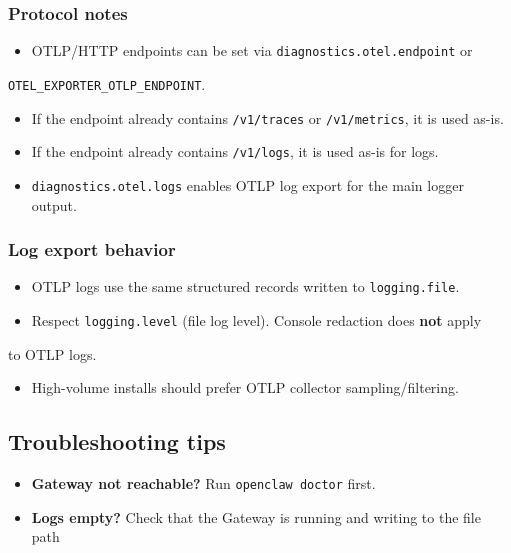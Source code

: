 \subsubsection{Protocol notes}


\begin{itemize}
  \item OTLP/HTTP endpoints can be set via \texttt{diagnostics.otel.endpoint} or
\end{itemize}

\texttt{OTEL\_EXPORTER\_OTLP\_ENDPOINT}.
\begin{itemize}
  \item If the endpoint already contains \texttt{/v1/traces} or \texttt{/v1/metrics}, it is used as-is.
  \item If the endpoint already contains \texttt{/v1/logs}, it is used as-is for logs.
  \item \texttt{diagnostics.otel.logs} enables OTLP log export for the main logger output.
\end{itemize}


\subsubsection{Log export behavior}


\begin{itemize}
  \item OTLP logs use the same structured records written to \texttt{logging.file}.
  \item Respect \texttt{logging.level} (file log level). Console redaction does \textbf{not} apply
\end{itemize}

to OTLP logs.
\begin{itemize}
  \item High-volume installs should prefer OTLP collector sampling/filtering.
\end{itemize}


\subsection{Troubleshooting tips}


\begin{itemize}
  \item \textbf{Gateway not reachable?} Run \texttt{openclaw doctor} first.
  \item \textbf{Logs empty?} Check that the Gateway is running and writing to the file path
\end{itemize}

